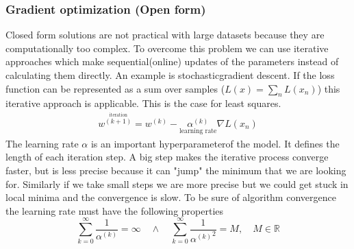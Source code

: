 \documentclass[../main.tex]{subfiles}
\begin{document}
\subsubsection{Gradient optimization (Open form)}
Closed form solutions are not practical with large datasets because they are computationally too complex. To overcome this problem we can use iterative approaches which make sequential(online) updates of the parameters instead of calculating them directly. An example is stochastic\footnotemark gradient descent. 
If the loss function can be represented as a sum over samples ($L(x)=\sum_nL(x_n)$) this iterative approach is applicable. This is the case for least squares.
\begin{align}
    w^{\overset{\text{iteration}}{(k+1)}}=w^{(k)}-\underset{\text{learning rate}}{\alpha^{(k)}} \nabla L(x_n)
\end{align}
The learning rate $\alpha$ is an important hyperparameter\footnotemark {}of the model. It defines the length of each iteration step. A big step makes the iterative process converge faster, but is less precise because it can "jump" the minimum that we are looking for. Similarly if we take small steps we are more precise but we could get stuck in local minima and the convergence is slow. To be sure of algorithm convergence the learning rate must have the following properties
\begin{equation}
    \sum_{k=0}^{\infty}\frac{1}{\alpha^{(k)}}=\infty \quad \wedge \quad \sum_{k=0}^{\infty}\frac{1}{{\alpha^{(k)}}^2}=M, \quad M\in\mathbb{R}
\end{equation}
\end{document}
